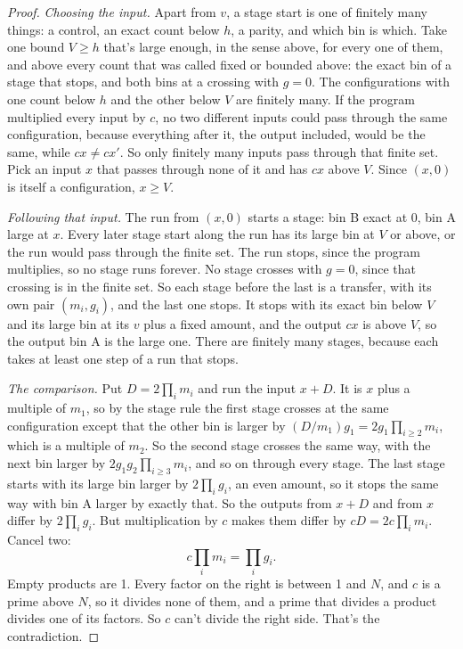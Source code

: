 \documentclass[11pt,twoside]{article}
\theoremstyle{thielethm}
\theoremstyle{thieledef}
\theoremstyle{thieledef}
\theoremstyle{thieledef}
\theoremstyle{thielethm}
\theoremstyle{thieleobs}
\theoremstyle{thielethm}
\begin{document}
\begin{proof}
\emph{Choosing the input.} Apart from $v$, a stage start is one of finitely many things: a
control, an exact count below $h$, a parity, and which bin is which. Take one bound $V \ge h$
that's large enough, in the sense above, for every one of them, and above every count that was
called fixed or bounded above: the exact bin of a stage that stops, and both bins at a crossing
with $g = 0$. The configurations with one count below $h$ and the other below $V$ are finitely
many. If the program multiplied every input by $c$, no two different inputs could pass through
the same configuration, because everything after it, the output included, would be the same,
while $cx \ne cx'$. So only finitely many inputs pass through that finite set. Pick an input $x$
that passes through none of it and has $cx$ above $V$. Since $(x, 0)$ is itself a configuration,
$x \ge V$.

\emph{Following that input.} The run from $(x, 0)$ starts a stage: bin B exact at 0, bin A large
at $x$. Every later stage start along the run has its large bin at $V$ or above, or the run would
pass through the finite set. The run stops, since the program multiplies, so no stage runs
forever. No stage crosses with $g = 0$, since that crossing is in the finite set. So each stage
before the last is a transfer, with its own pair $(m_i, g_i)$, and the last one stops. It stops
with its exact bin below $V$ and its large bin at its $v$ plus a fixed amount, and the output $cx$
is above $V$, so the output bin A is the large one. There are finitely many stages, because each
takes at least one step of a run that stops.

\emph{The comparison.} Put $D = 2\prod_i m_i$ and run the input $x + D$. It is $x$ plus a
multiple of $m_1$, so by the stage rule the first stage crosses at the same configuration except
that the other bin is larger by $(D / m_1) g_1 = 2 g_1 \prod_{i \ge 2} m_i$, which is a multiple of
$m_2$. So the second stage crosses the same way, with the next bin larger by
$2 g_1 g_2 \prod_{i \ge 3} m_i$, and so on through every stage. The last stage starts with its
large bin larger by $2\prod_i g_i$, an even amount, so it stops the same way with bin A larger by
exactly that. So the outputs from $x + D$ and from $x$ differ by $2\prod_i g_i$. But
multiplication by $c$ makes them differ by $cD = 2c\prod_i m_i$. Cancel two:
\[
c\prod_i m_i=\prod_i g_i.
\]
Empty products are 1. Every factor on the right is between 1 and $N$, and
$c$ is a prime above $N$, so it divides none of them, and a prime that divides a
product divides one of its factors. So $c$ can't divide the right side. That's the
contradiction.
\end{proof}
\end{document}
